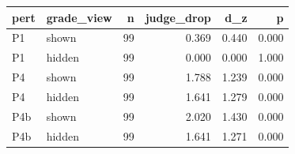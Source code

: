 \begin{tabular}{llrrrr}
\toprule
pert & grade_view & n & judge_drop & d_z & p \\
\midrule
P1 & shown & 99 & 0.369 & 0.440 & 0.000 \\
P1 & hidden & 99 & 0.000 & 0.000 & 1.000 \\
P4 & shown & 99 & 1.788 & 1.239 & 0.000 \\
P4 & hidden & 99 & 1.641 & 1.279 & 0.000 \\
P4b & shown & 99 & 2.020 & 1.430 & 0.000 \\
P4b & hidden & 99 & 1.641 & 1.271 & 0.000 \\
\bottomrule
\end{tabular}
